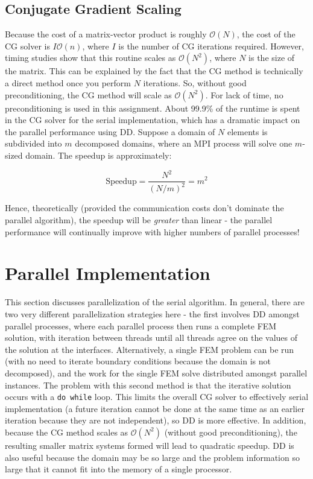 \documentclass[10pt]{article}
\newcommand{\beq}{\begin{equation}}
\newcommand{\eeq}{\end{equation}}
\begin{document}
\subsection{Conjugate Gradient Scaling}
Because the cost of a matrix-vector product is roughly \(\mathscr{O}(N)\), the cost of the CG solver is \(I\mathscr{O}(n)\), where \(I\) is the number of CG iterations required. However, timing studies show that this routine scales as \(\mathscr{O}(N^2)\), where \(N\) is the size of the matrix. This can be explained by the fact that the CG method is technically a direct method once you perform \(N\) iterations. So, without good preconditioning, the CG method will scale as \(\mathscr{O}(N^2)\). For lack of time, no preconditioning is used in this assignment. About 99.9\% of the runtime is spent in the CG solver for the serial implementation, which has a dramatic impact on the parallel performance using DD. Suppose a domain of \(N\) elements is subdivided into \(m\) decomposed domains, where an MPI process will solve one \(m\)-sized domain. The speedup is approximately:

\beq
\textrm{Speedup}=\frac{N^2}{(N/m)^2}=m^2
\eeq

Hence, theoretically (provided the communication costs don't dominate the parallel algorithm), the speedup will be {\it greater} than linear - the parallel performance will continually improve with higher numbers of parallel processes! 


\section{Parallel Implementation}
This section discusses parallelization of the serial algorithm. In general, there are two very different parallelization strategies here - the first involves DD amongst parallel processes, where each parallel process then runs a complete FEM solution, with iteration between threads until all threads agree on the values of the solution at the interfaces. Alternatively, a single FEM problem can be run (with no need to iterate boundary conditions because the domain is not decomposed), and the work for the single FEM solve distributed amongst parallel instances. The problem with this second method is that the iterative solution occurs with a {\tt do while} loop. This limits the overall CG solver to effectively serial implementation (a future iteration cannot be done at the same time as an earlier iteration because they are not independent), so DD is more effective. In addition, because the CG method scales as \(\mathscr{O}(N^2)\) (without good preconditioning), the resulting smaller matrix systems formed will lead to quadratic speedup. DD is also useful because the domain may be so large and the problem information so large that it cannot fit into the memory of a single processor. 
\end{document}

